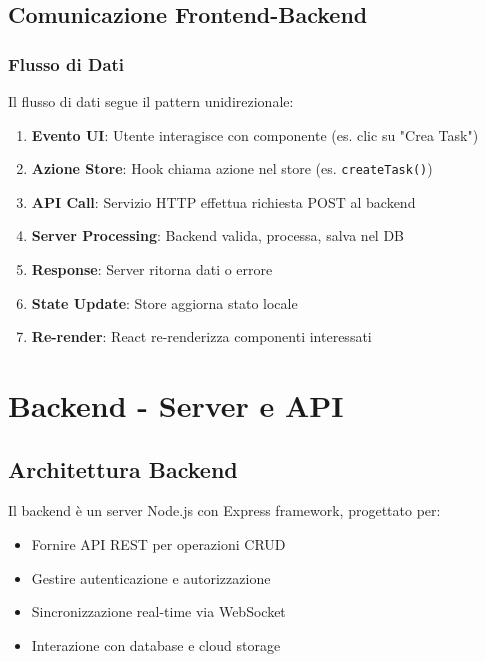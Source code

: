 \documentclass[12pt,a4paper]{report}
\begin{document}
\section{Comunicazione Frontend-Backend}

\subsection{Flusso di Dati}

Il flusso di dati segue il pattern unidirezionale:

\begin{enumerate}
    \item \textbf{Evento UI}: Utente interagisce con componente (es. clic su "Crea Task")
    \item \textbf{Azione Store}: Hook chiama azione nel store (es. \texttt{createTask()})
    \item \textbf{API Call}: Servizio HTTP effettua richiesta POST al backend
    \item \textbf{Server Processing}: Backend valida, processa, salva nel DB
    \item \textbf{Response}: Server ritorna dati o errore
    \item \textbf{State Update}: Store aggiorna stato locale
    \item \textbf{Re-render}: React re-renderizza componenti interessati
\end{enumerate}

\newpage

\chapter{Backend - Server e API}

\section{Architettura Backend}

Il backend è un server Node.js con Express framework, progettato per:
\begin{itemize}
    \item Fornire API REST per operazioni CRUD
    \item Gestire autenticazione e autorizzazione
    \item Sincronizzazione real-time via WebSocket
    \item Interazione con database e cloud storage
\end{itemize}
\end{document}
